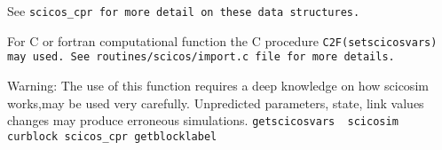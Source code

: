See %
\tt scicos\_cpr %
\rm for more detail on these data structures.
\par\noindent
For C or fortran computational function the C procedure
%
\tt C2F(setscicosvars) %
\rm may used. See
%
\tt routines/scicos/import.c %
\rm file for more details.
\par\noindent
Warning: The use of this function requires a deep knowledge on how
scicosim works,may be used very carefully. Unpredicted parameters,
state, link values changes  may produce erroneous simulations.
{\verb?getscicosvars  scicosim  curblock scicos_cpr getblocklabel?} \pageref{getscicosvarsscicosimcurblockscicoscprgetblocklabel}

